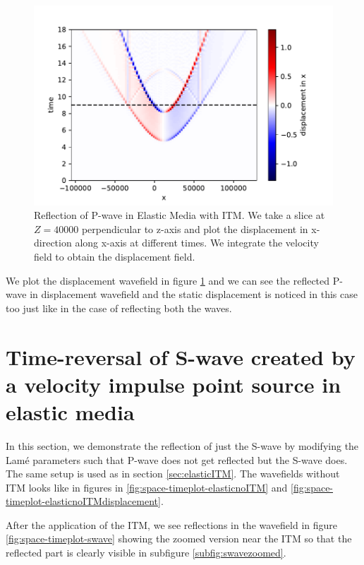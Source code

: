 \begin{figure}[!htpb] %
    \centering
    \includegraphics[width=0.75\linewidth]{figures/pwave-ITMdisplacement.pdf}
    \caption{Reflection of P-wave in Elastic Media with \ac{ITM}. We take a slice at $Z=40000$ perpendicular to z-axis
    and plot the displacement in x-direction along x-axis at different times. We integrate the velocity field to obtain the displacement field.}
    \label{fig:space-timeplot-pwavedisplacement}
\end{figure}

We plot the displacement wavefield in figure \ref{fig:space-timeplot-pwavedisplacement} and we can see the reflected P- wave in displacement wavefield and the static
displacement is noticed in this case too just like in the case of reflecting both the waves. 

\section{Time-reversal of S-wave created by a velocity impulse point source in elastic media} \label{sec:elasticITMswave}
In this section, we demonstrate the reflection of just the S-wave by modifying the Lam\'{e} parameters such that P-wave does not
get reflected but the S-wave does. The same setup is used as in section \ref{sec:elasticITM}. The wavefields without \ac{ITM} looks like in figures in \ref{fig:space-timeplot-elasticnoITM}
and \ref{fig:space-timeplot-elasticnoITMdisplacement}.
\par After the application of the \ac{ITM}, we see reflections in the wavefield in figure \ref{fig:space-timeplot-swave} showing the zoomed version near the 
\ac{ITM} so that the reflected part is clearly visible in subfigure \ref{subfig:swavezoomed}.

